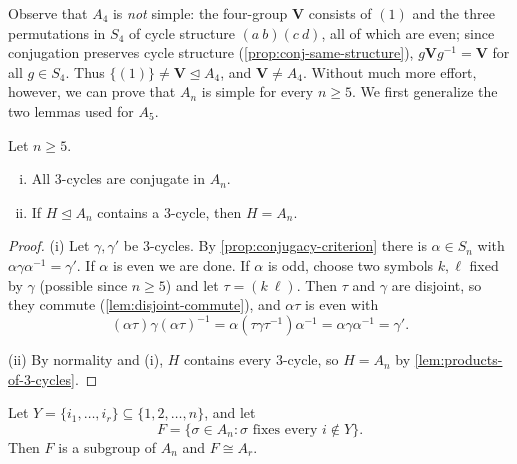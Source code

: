 Observe that \(A_4\) is \emph{not} simple: the four-group \(\mathbf V\) consists of
\((1)\) and the three permutations in \(S_4\) of cycle structure \((a\ b)(c\ d)\), all of
which are even; since conjugation preserves cycle structure
(\autoref{prop:conj-same-structure}), \(g\mathbf Vg^{-1} = \mathbf V\) for all
\(g \in S_4\). Thus \(\{(1)\} \neq \mathbf V \trianglelefteq A_4\), and
\(\mathbf V \neq A_4\). Without much more effort, however, we can prove that \(A_n\) is
simple for every \(n \geq 5\). We first generalize the two lemmas used for \(A_5\).

\begin{lemma}\label{lem:An-3-cycles}
	Let \(n \geq 5\).
	\begin{enumerate}[(i)]
		\item All \(3\)-cycles are conjugate in \(A_n\).
		\item If \(H \trianglelefteq A_n\) contains a \(3\)-cycle, then \(H = A_n\).
	\end{enumerate}
\end{lemma}

\begin{proof}
	(i) Let \(\gamma, \gamma'\) be \(3\)-cycles. By \autoref{prop:conjugacy-criterion}
	there is \(\alpha \in S_n\) with \(\alpha\gamma\alpha^{-1} = \gamma'\). If \(\alpha\) is
	even we are done. If \(\alpha\) is odd, choose two symbols \(k, \ell\) fixed by
	\(\gamma\) (possible since \(n \geq 5\)) and let \(\tau = (k\ \ell)\). Then \(\tau\)
	and \(\gamma\) are disjoint, so they commute (\autoref{lem:disjoint-commute}), and
	\(\alpha\tau\) is even with
	\[
		(\alpha\tau)\gamma(\alpha\tau)^{-1} = \alpha(\tau\gamma\tau^{-1})\alpha^{-1}
		= \alpha\gamma\alpha^{-1} = \gamma'.
	\]

	(ii) By normality and (i), \(H\) contains every \(3\)-cycle, so \(H = A_n\) by
	\autoref{lem:products-of-3-cycles}.
\end{proof}

\begin{lemma}\label{lem:F-iso-Ar}
	Let \(Y = \{i_1, \dots, i_r\} \subseteq \{1, 2, \dots, n\}\), and let
	\[
		F = \{\sigma \in A_n : \sigma \text{ fixes every } i \notin Y\}.
	\]
	Then \(F\) is a subgroup of \(A_n\) and \(F \cong A_r\).
\end{lemma}

